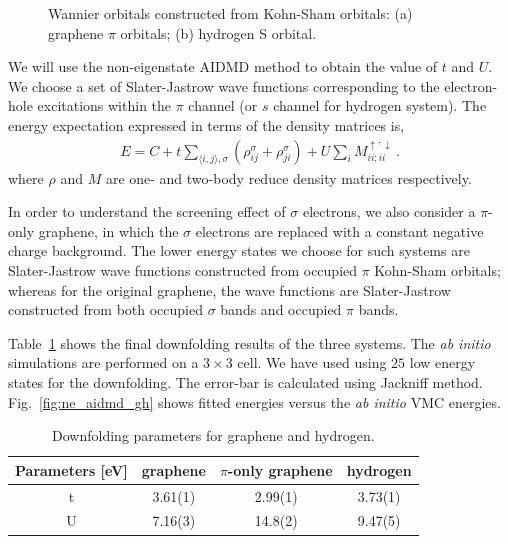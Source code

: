 \begin{figure}[hbt]
  \centering  
       \caption{Wannier orbitals constructed from Kohn-Sham orbitals: (a) graphene $\pi$ orbitals; (b) hydrogen S orbital. }
\label{fig:wan}
\end{figure}

We will use the non-eigenstate AIDMD method to obtain the value of $t$ and $U$. We choose a set of Slater-Jastrow wave functions corresponding to the electron-hole excitations within the $\pi$ channel (or $s$ channel for hydrogen system). The energy expectation expressed in terms of the density matrices is, 
\begin{eqnarray}\label{eq:en}
E = C + t\sum_{\langle i, j\rangle, \sigma}( \rho_{ij}^\sigma + \rho_{ji}^\sigma) + U \sum_{i}M_{ii;ii}^{\uparrow,\downarrow}\,.
\end{eqnarray}
where $\rho$ and $M$ are one- and two-body reduce density matrices respectively.

In order to understand the screening effect of $\sigma$ electrons, we also consider a $\pi$-only graphene, in which the $\sigma$ electrons are replaced with a constant negative charge background. The lower energy states we choose for such systems are Slater-Jastrow wave functions constructed from occupied $\pi$ Kohn-Sham orbitals; whereas for the original graphene, the wave functions are Slater-Jastrow constructed from both occupied $\sigma$ bands and occupied $\pi$ bands. 

Table~\ref{tab:grpheffm} shows the final downfolding results of the three systems. The \textit{ab initio} simulations are performed on a $3\times3$ cell. We have used using $25$ low energy states for the downfolding. The error-bar is calculated using Jackniff method. Fig.~\ref{fig:ne_aidmd_gh} shows fitted energies versus the \textit{ab initio} VMC energies. 
\begin{table}[ht]
\label{tab:grpheffm}
\centering
\begin{tabular}{|c|c|c|c|}
\hline
Parameters [eV] & graphene & $\pi$-only graphene &hydrogen \\
\hline
\hline
t & 3.61(1) & 2.99(1) & 3.73(1)\\
U & 7.16(3) & 14.8(2) & 9.47(5)\\
\hline
\end{tabular}
\caption{Downfolding parameters for graphene and hydrogen.}
\end{table} 

